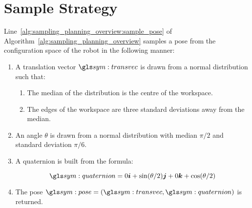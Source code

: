 	\section{Sample Strategy}%
	\label{sec:sample_strategy}

		Line~\ref{alg:sampling_planning_overview:sample_pose} of
		Algorithm~\ref{alg:sampling_planning_overview} samples a pose from the
		configuration space of the robot in the following manner:

		\begin{enumerate}

			\item

				A translation vector $\transvec$ is drawn from a normal
				distribution such that:
				\label{item:sample_strategy:translation}

				\begin{enumerate}

					\item

						The median of the distribution is the centre of the
						workspace.

					\item

						The edges of the workspace are three standard deviations
						away from the median.
				\end{enumerate}

			\item

				An angle $\theta$ is drawn from a normal distribution with
				median $\pi/2$ and standard deviation $\pi/6$.

				\label{item:sample_strategy:angle}

			\item

				A quaternion is built from the formula:

				\begin{equation}
					\quaternion = 0\vec{i} + \sin(\theta/2)\vec{j} + 0\vec{k} +
						\cos(\theta/2)
				\end{equation}

				\label{item:sample_strategy:quaternion}


			\item

				The pose $\pose = (\transvec, \quaternion)$ is returned.

		\end{enumerate}

